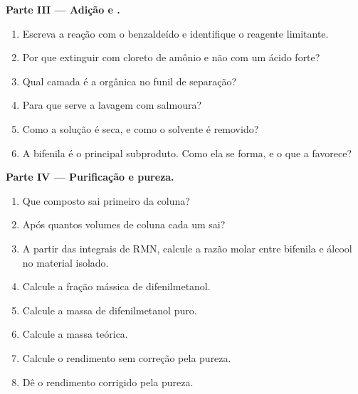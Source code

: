 \begin{problem}
\medskip
\noindent\textbf{Parte III --- Adição e .}
\begin{enumerate}[resume]
  \item Escreva a reação com o benzaldeído e identifique o reagente limitante.
  \item Por que extinguir com cloreto de amônio e não com um ácido forte?
  \item Qual camada é a orgânica no funil de separação?
  \item Para que serve a lavagem com salmoura?
  \item Como a solução é seca, e como o solvente é removido?
  \item A bifenila é o principal subproduto. Como ela se forma, e o que a favorece?
\end{enumerate}

\medskip
\noindent\textbf{Parte IV --- Purificação e pureza.}
\begin{enumerate}[resume]
  \item Que composto sai primeiro da coluna?
  \item Após quantos volumes de coluna cada um sai?
  \item A partir das integrais de RMN, calcule a razão molar entre bifenila e álcool no material
        isolado.
  \item Calcule a fração mássica de difenilmetanol.
  \item Calcule a massa de difenilmetanol puro.
  \item Calcule a massa teórica.
  \item Calcule o rendimento sem correção pela pureza.
  \item Dê o rendimento corrigido pela pureza.
\end{enumerate}
\end{problem}
